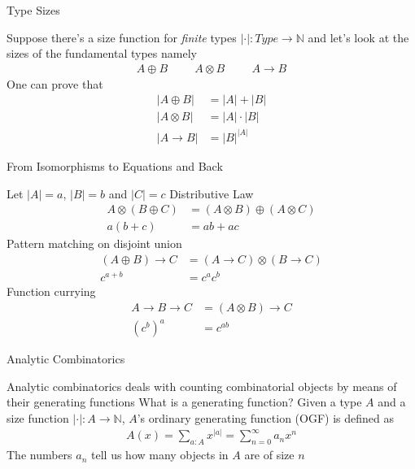 \documentclass[pdf]{beamer}
\begin{document}
\begin{frame}{Type Sizes}
  \begin{outline}
    \1 Suppose there's a size function for \textit{finite} types $|\cdot| : Type \to \mathbb{N}$ and let's look at the sizes of the fundamental types namely
    \begin{align*}
      A \oplus B \hspace{1cm} A \otimes B \hspace{1cm} A \to B
    \end{align*}
    \1 One can prove that
    \begin{align*}
      |A \oplus B| &= |A| + |B| \\
      |A \otimes B| &= |A| \cdot |B| \\
      |A \to B| &= |B|^{|A|}
    \end{align*}
  \end{outline}
\end{frame}

\begin{frame}{From Isomorphisms to Equations and Back}
  \begin{outline}
    \1 Let $|A| = a$, $|B| = b$ and $|C| = c$
    \1 Distributive Law
    \begin{align*}
      A \otimes (B \oplus C) &= (A \otimes B) \oplus (A \otimes C) \\
      a(b+c) &= a b + a c
    \end{align*}
    \1 Pattern matching on disjoint union
    \begin{align*}
      (A \oplus B) \to C &= (A \to C) \otimes (B \to C) \\
      c^{a+b} &= c^{a} c^{b}
    \end{align*}
    \1 Function currying
    \begin{align*}
      A \to B \to C &= (A \otimes B) \to C \\
      (c^b)^a &= c^{a b}
    \end{align*}
  \end{outline}
\end{frame}

\begin{frame}{Analytic Combinatorics}
  \begin{outline}
    \1 Analytic combinatorics deals with counting combinatorial objects by means of their generating functions
    \1 What is a generating function?
    \1 Given a type $A$ and a size function $|\cdot| : A \to \mathbb{N}$, $A$'s ordinary generating function (OGF) is defined as
    \begin{align*}
      A(x) = \sum_{a : A}{x^{|a|}} = \sum_{n=0}^{\infty}{a_n x^n}
    \end{align*}
    \1 The numbers $a_n$ tell us how many objects in $A$ are of size $n$
  \end{outline}
\end{frame}
\end{document}
